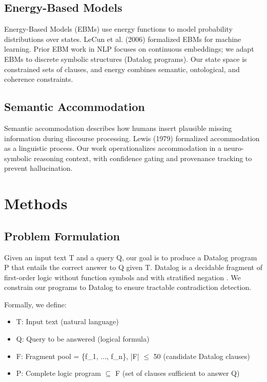 \documentclass[11pt,letterpaper]{article}
\begin{document}
\subsection{Energy-Based Models}

Energy-Based Models (EBMs) \cite{LeCun2006} use energy functions to model probability distributions over states. LeCun et al. (2006) formalized EBMs for machine learning. Prior EBM work in NLP focuses on continuous embeddings; we adapt EBMs to discrete symbolic structures (Datalog programs). Our state space is constrained sets of clauses, and energy combines semantic, ontological, and coherence constraints.

\subsection{Semantic Accommodation}

Semantic accommodation \cite{Lewis1979} describes how humans insert plausible missing information during discourse processing. Lewis (1979) formalized accommodation as a linguistic process. Our work operationalizes accommodation in a neuro-symbolic reasoning context, with confidence gating and provenance tracking to prevent hallucination.

\section{Methods}

\subsection{Problem Formulation}

Given an input text T and a query Q, our goal is to produce a Datalog program P that entails the correct answer to Q given T. Datalog is a decidable fragment of first-order logic without function symbols and with stratified negation \cite{Ceri1989}. We constrain our programs to Datalog to ensure tractable contradiction detection.

Formally, we define:
\begin{itemize}
  \item T: Input text (natural language)
  \item Q: Query to be answered (logical formula)
  \item F: Fragment pool = \{f\_1, ..., f\_n\}, |F| $\leq$ 50 (candidate Datalog clauses)
  \item P: Complete logic program $\subseteq$ F (set of clauses sufficient to answer Q)
\end{itemize}
\end{document}
